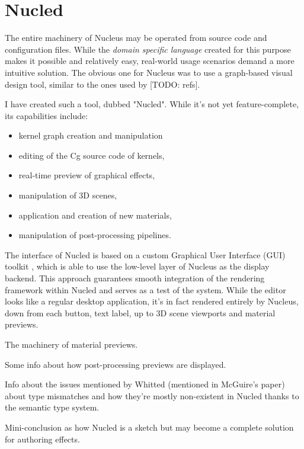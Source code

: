 
\chapter{ Nucled }
\label{Chapter5}

The entire machinery of Nucleus may be operated from source code and configuration files. While the \emph{ domain specific language } created for this purpose makes it possible and relatively easy, real-world usage scenarios demand a more intuitive solution. The obvious one for Nucleus was to use a graph-based visual design tool, similar to the ones used by [TODO: refs].

I have created such a tool, dubbed "Nucled". While it's not yet feature-complete, its capabilities include:

\begin{itemize}
\item kernel graph creation and manipulation
\item editing of the Cg source code of kernels,
\item real-time preview of graphical effects,
\item manipulation of 3D scenes,
\item application and creation of new materials,
\item manipulation of post-processing pipelines.
\end{itemize}

The interface of Nucled is based on a custom Graphical User Interface (GUI) toolkit \cite{HybridGUI}, which is able to use the low-level layer of Nucleus as the display backend. This approach guarantees smooth integration of the rendering framework within Nucled and serves as a test of the system. While the editor looks like a regular desktop application, it's in fact rendered entirely by Nucleus, down from each button, text label, up to 3D scene viewports and material previews.

The machinery of material previews.

Some info about how post-processing previews are displayed.

Info about the issues mentioned by Whitted (mentioned in McGuire's paper) about type mismatches and how they're mostly non-existent in Nucled thanks to the semantic type system.

Mini-conclusion as how Nucled is a sketch but may become a complete solution for authoring effects.
